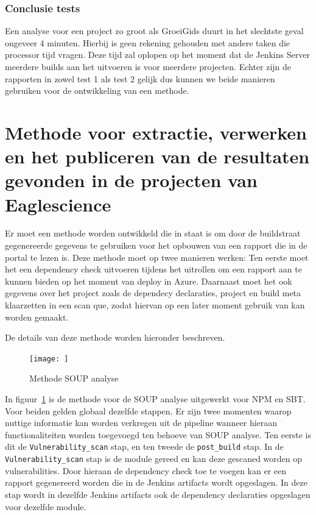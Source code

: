 \subsubsection{Conclusie tests}
Een analyse voor een project zo groot als GroeiGids duurt in het slechtste geval ongeveer 4 minuten. Hierbij is geen rekening gehouden met andere taken die processor tijd vragen. Deze tijd zal oplopen op het moment dat de Jenkins Server meerdere builds aan het uitvoeren is voor meerdere projecten. Echter zijn de rapporten in zowel test 1 als test 2 gelijk dus kunnen we beide manieren gebruiken voor de ontwikkeling van een methode.

\newpage


\section{Methode voor extractie, verwerken en het publiceren van de resultaten gevonden in de projecten van Eaglescience}\label{subsec:methodeSOUPES}

Er moet een methode worden ontwikkeld die in staat is om door de buildstraat gegenereerde gegevens te gebruiken voor het opbouwen van een rapport die in de portal te lezen is.
Deze methode moet op twee manieren werken:
Ten eerste moet het een dependency check uitvoeren tijdens het uitrollen om een rapport aan te kunnen bieden op het moment van deploy in Azure. Daarnaast moet het ook gegevens over het project zoals de dependecy declaraties, project en build meta klaarzetten in een scan que, zodat hiervan op een later moment gebruik van kan worden gemaakt.

De details van deze methode worden hieronder beschreven.

\begin{figure}
    \centering
    \texttt{[image: ]}
    \caption{Methode SOUP analyse}
    \label{fig:methodeSOUPanalyse}
\end{figure}

In figuur~\ref{fig:methodeSOUPanalyse} is de methode voor de SOUP analyse uitgewerkt voor NPM en SBT. Voor beiden gelden globaal dezelfde stappen. Er zijn twee momenten waarop nuttige informatie kan worden verkregen uit de pipeline wanneer hieraan functionaliteiten worden toegevoegd ten behoeve van SOUP analyse. Ten eerste is dit de \texttt{Vulnerability\_scan} stap, en ten tweede de \texttt{post\_build} stap. In de \texttt{Vulnerability\_scan} stap is de module gereed en kan deze gescaned worden op vulnerabilities. Door hieraan de dependency check toe te voegen kan er een rapport gegenereerd worden die in de Jenkins artifacts wordt opgeslagen. In deze stap wordt in dezelfde Jenkins artifacts ook de dependency declaraties opgeslagen voor dezelfde module.

